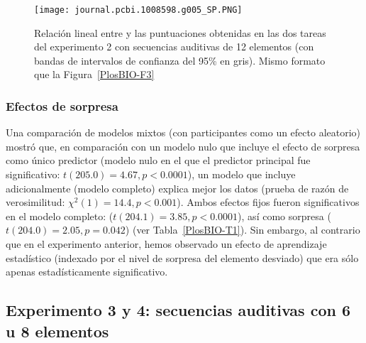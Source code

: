 \begin{figure}[t!]
   \texttt{[image: journal.pcbi.1008598.g005\_SP.PNG]}
   \centering
   \caption{Relación lineal entre \mdlbin y las puntuaciones obtenidas en las dos tareas del experimento 2 con secuencias auditivas de 12 elementos (con bandas de intervalos de confianza del 95\% en gris). Mismo formato que la Figura~\ref{PlosBIO-F3}}
   \label{PlosBIO-F5}
\end{figure}

\subsubsection*{Efectos de sorpresa}

Una comparación de modelos mixtos (con participantes como un efecto aleatorio) mostró que, en comparación con un modelo nulo que incluye el efecto de sorpresa como único predictor (modelo nulo en el que el predictor principal fue significativo: $t (205.0) = 4.67, p < 0.0001$), un modelo que incluye adicionalmente \mdlbin (modelo completo) explica mejor los datos (prueba de razón de verosimilitud: $\chi^2(1) = 14.4, p < 0.001$). Ambos efectos fijos fueron significativos en el modelo completo: \mdlbin ($t (204.1) = 3.85, p < 0.0001$), así como sorpresa ($t (204.0) = 2.05, p= 0.042$) (ver Tabla~\ref{PlosBIO-T1}). Sin embargo, al contrario que en el experimento anterior, hemos observado un efecto de aprendizaje estadístico (indexado por el nivel de sorpresa del elemento desviado) que era sólo apenas estadísticamente significativo.

\subsection{Experimento 3 y 4: secuencias auditivas con 6 u 8 elementos}

